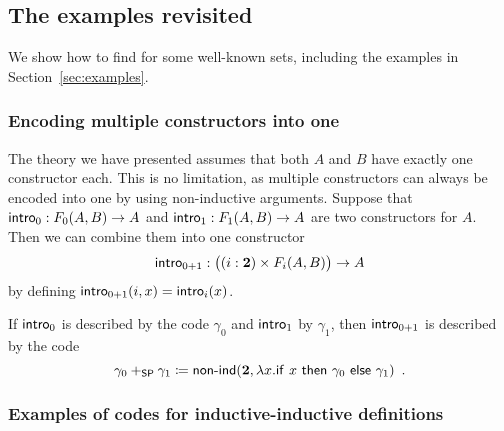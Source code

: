 \documentclass{schwicht}
\begin{document}
\subsection{The examples revisited}
\label{sec:examples-revisited}

We show how to find \gammaAB{} for some well-known sets, including the
examples in Section~\ref{sec:examples}.

\subsubsection{Encoding multiple constructors into one}
\label{sec:comb-constructors}

The theory we have presented assumes that both $A$ and $B$ have
exactly one constructor each. This is no limitation, as multiple
constructors can always be encoded into one by using non-inductive
arguments. Suppose that $\mathsf{intro}_{0} : F_0(A, B) \to A$ and $\mathsf{intro}_{1} :
F_1(A, B) \to A$ are two constructors for $A$. Then we can combine
them into one constructor
\[
\mathsf{intro}_{0 + 1} : \big((i : \mathbf{2}) \times F_i(A, B)\big) \to A
\]
by defining $\mathsf{intro}_{0 +1}(i, x) = \mathsf{intro}_{i}(x)$.

If $\mathsf{intro}_{0}$ is described by the code $\gamma_0$ and $\mathsf{intro}_{1}$ by
$\gamma_1$, then $\mathsf{intro}_{0 + 1}$ is described by the code
\[
\gamma_0 +_{\mathsf{SP}} \gamma_1 \coloneqq
\mathsf{non}\text{-}\mathsf{ind}(\mathbf{2}, \lambda x.\mathsf{if}~x~\mathsf{then}~\gamma_0~\mathsf{else}~\gamma_1) \enspace .
\]


\subsubsection{Examples of codes for inductive-inductive definitions}
\end{document}
